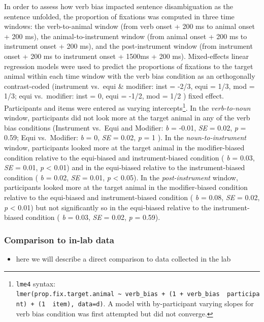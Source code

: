 \documentclass[
  english,
  man,floatsintext]{apa6}
\providecommand{\tightlist}{%
  \setlength{\itemsep}{0pt}\setlength{\parskip}{0pt}}
\begin{document}
In order to assess how verb bias impacted sentence disambiguation as the sentence unfolded, the proportion of fixations was computed in three time windows: the verb-to-animal window (from verb onset + 200 ms to animal onset + 200 ms), the animal-to-instrument window (from animal onset + 200 ms to instrument onset + 200 ms), and the post-instrument window (from instrument onset + 200 ms to instrument onset + 1500ms + 200 ms). Mixed-effects linear regression models were used to predict the proportions of fixations to the target animal within each time window with the verb bias condition as an orthogonally contrast-coded (instrument vs.~equi \& modifier: inst = -2/3, equi = 1/3, mod = 1/3; equi vs.~modifier: inst = 0, equi = -1/2, mod = 1/2 ) fixed effect. Participants and items were entered as varying intercepts\footnote{\texttt{lme4} syntax: \texttt{lmer(prop.fix.target.animal\ \textasciitilde{}\ verb\_bias\ +\ (1\ +\ verb\_bias\ \textbar{}\ participant)\ +\ (1\ \textbar{}\ item),\ data=d)}. A model with by-participant varying slopes for verb bias condition was first attempted but did not converge.}. In the \emph{verb-to-noun} window, participants did not look more at the target animal in any of the verb bias conditions (Instrument vs.~Equi and Modifier: \emph{b} = -0.01, \emph{SE} = 0.02, \emph{p} = 0.59; Equi vs.~Modifier: \emph{b} = 0, \emph{SE} = 0.02, \emph{p} = 1 ). In the \emph{noun-to-instrument} window, participants looked more at the target animal in the modifier-biased condition relative to the equi-biased and instrument-biased condition ( \emph{b} = 0.03, \emph{SE} = 0.01, \emph{p} \textless{} 0.01) and in the equi-biased relative to the instrument-biased condition ( \emph{b} = 0.02, \emph{SE} = 0.01, \emph{p} \textless{} 0.05). In the \emph{post-instrument} window, participants looked more at the target animal in the modifier-biased condition relative to the equi-biased and instrument-biased condition ( \emph{b} = 0.08, \emph{SE} = 0.02, \emph{p} \textless{} 0.01) but not significantly so in the equi-biased relative to the instrument-biased condition ( \emph{b} = 0.03, \emph{SE} = 0.02, \emph{p} = 0.59).

\hypertarget{comparison-to-in-lab-data-1}{%
\subsubsection{Comparison to in-lab data}\label{comparison-to-in-lab-data-1}}

\begin{itemize}
\tightlist
\item
  here we will describe a direct comparison to data collected in the lab
\end{itemize}
\end{document}
